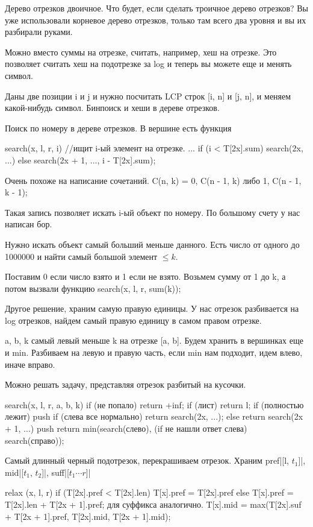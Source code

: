 Дерево отрезков двоичное. Что будет, если сделать троичное дерево отрезков? Вы уже использовали корневое дерево отрезков, только 
там всего два уровня и вы их разбирали руками. 

Можно вместо суммы на отрезке, считать, например, хеш на отрезке. Это позволяет считать хеш на подотрезке за log и теперь вы можете еще и менять символ.


Даны две позиции i и j  и нужно посчитать LCP строк [i, n] и [j, n], и меняем какой-нибудь символ. Бинпоиск и хеши в дереве отрезков.

Поиск по номеру в дереве отрезков.
В вершине есть функция
\begin{cppcode}
search(x, l, r, i) {//ищит i-ый элемент на отрезке.
    ...
    if (i < T[2x].sum) {
        search(2x, ...)
    } else {
        search(2x + 1, ..., i - T[2x].sum);
    }
}
\end{cppcode}  

Очень похоже на написание сочетаний.
C(n, k) = 0, C(n - 1, k) либо 1, C(n - 1, k - 1);

Такая запись позволяет искать i-ый объект по номеру. По большому счету у нас написан бор.

Нужно искать объект самый больший меньше данного. Есть число от одного до 1000000 и найти самый большой элемент $\le k$.

Поставим 0 если число взято и 1 если не взято. Возьмем сумму от 1 до k, а потом вызвали функцию search(x, l, r, sum(k));

Другое решение, храним самую правую единицы.  У нас отрезок разбивается на log отрезков, найдем самый правую единицу в самом правом отрезке.

a, b, k самый левый меньше k на отрезке [a, b]. Будем хранить в вершинках еще и min. Разбиваем на левую и правую
часть, если min нам подходит, идем влево, иначе вправо.

Можно решать задачу, представляя отрезок разбитый на кусочки.

\begin{cppcode}
search(x, l, r, a, b, k) {
    if (не попало) return +inf;
    if (лист) return l;
    if (полностью лежит) {
        push
        if (слева все нормально) return search(2x, ...);
        else return search(2x + 1, ...)
    }
    push
    return min(search(слево), (if не нашли ответ слева) search(справо));
}
\end{cppcode}

Самый длинный черный подотрезок, перекрашиваем отрезок.
Храним pref|[l, $t_1$]|, mid|[$t_1$, $t_2$]|, suff|[$t_1 \cdots r$]|

\begin{cppcode}
relax (x, l, r)
    if (T[2x].pref < T[2x].len) {
       T[x].pref = T[2x].pref
    } else {
       T[x].pref = T[2x].len + T[2x + 1].pref;
    }
    для суффикса аналогично.
    T[x].mid = max(T[2x].suf + T[2x  + 1].pref, T[2x].mid, T[2x + 1].mid);                                      
\end{cppcode}

